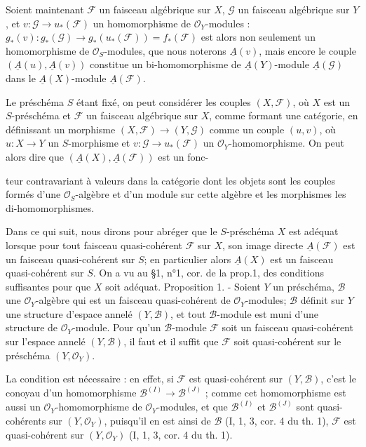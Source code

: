 Soient maintenant $\mathcal{F}$ un faisceau algébrique sur $X$, $\mathcal{G}$ un faisceau algébrique sur $Y$, et $v : \mathcal{G} \to u_*(\mathcal{F})$ un homomorphisme de $\mathcal{O}_Y$-modules : $g_*(v) : g_*(\mathcal{G}) \to g_*(u_*(\mathcal{F})) = f_*(\mathcal{F})$ est alors non seulement un homomorphisme de $\mathcal{O}_S$-modules, que nous noterons $\underline{A}(v)$, mais encore le couple $(\underline{A}(u), \underline{A}(v))$ constitue un bi-homomorphisme de $\underline{A}(Y)$-module $\underline{A}(\mathcal{G})$ dans le $\underline{A}(X)$-module $\underline{A}(\mathcal{F})$.

Le préschéma $S$ étant fixé, on peut considérer les couples $(X, \mathcal{F})$, où $X$ est un $S$-préschéma et $\mathcal{F}$ un faisceau algébrique sur $X$, comme formant une catégorie, en définissant un morphisme $(X, \mathcal{F}) \to (Y, \mathcal{G})$ comme un couple $(u, v)$, où $u : X \to Y$ un $S$-morphisme et $v : \mathcal{G} \to u_*(\mathcal{F})$ un $\mathcal{O}_Y$-homomorphisme. On peut alors dire que $(\underline{A}(X), \underline{A}(\mathcal{F}))$ est un fonc-

\newpage


teur contravariant à valeurs dans la catégorie dont les objets sont
les couples formés d'une $\mathcal{O}_S$-algèbre et d'un module sur cette algèbre
et les morphismes les di-homomorphismes.

Dans ce qui suit, nous dirons pour abréger que le $S$-préschéma $X$ est
adéquat lorsque pour tout faisceau quasi-cohérent $\mathcal{F}$ sur $X$, son image
directe $\underline{A}(\mathcal{F})$ est un faisceau quasi-cohérent sur $S$; en particulier
alors $\underline{A}(X)$ est un faisceau quasi-cohérent sur $S$. On a vu au §1, n°1, cor.
de la prop.1, des conditions suffisantes pour que $X$ soit adéquat.
Proposition 1. - Soient $Y$ un préschéma, $\mathcal{B}$ une $\mathcal{O}_Y$-algèbre qui
est un faisceau quasi-cohérent de $\mathcal{O}_Y$-modules; $\mathcal{B}$ définit sur $Y$ une
structure d'espace annelé $(Y, \mathcal{B})$, et tout $\mathcal{B}$-module est muni d'une
structure de $\mathcal{O}_Y$-module. Pour qu'un $\mathcal{B}$-module $\mathcal{F}$ soit un faisceau
quasi-cohérent sur l'espace annelé $(Y, \mathcal{B})$, il faut et il suffit que
$\mathcal{F}$ soit quasi-cohérent sur le préschéma $(Y, \mathcal{O}_Y)$.

La condition est nécessaire : en effet, si $\mathcal{F}$ est quasi-cohérent sur
$(Y, \mathcal{B})$, c'est le conoyau d'un homomorphisme $\mathcal{B}^{(I)} \to \mathcal{B}^{(J)}$ ; comme cet
homomorphisme est aussi un $\mathcal{O}_Y$-homomorphisme de $\mathcal{O}_Y$-modules, et que
$\mathcal{B}^{(I)}$ et $\mathcal{B}^{(J)}$ sont quasi-cohérents sur $(Y, \mathcal{O}_Y)$, puisqu'il en est ainsi
de $\mathcal{B}$ (I, 1, 3, cor. 4 du th. 1), $\mathcal{F}$ est quasi-cohérent sur $(Y, \mathcal{O}_Y)$ (I, 1, 3,
cor. 4 du th. 1).


